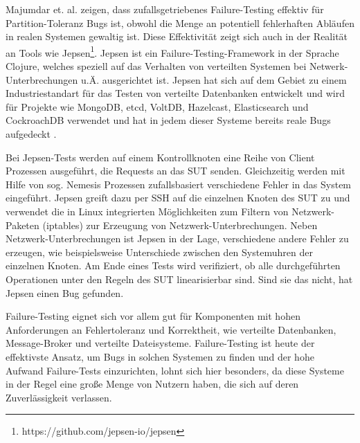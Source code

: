 \documentclass[12pt,a4paper]{report}
\begin{document}
Majumdar et. al. \cite{why_is_random_testing_effective} zeigen, dass zufallsgetriebenes Failure-Testing effektiv für
Partition-Toleranz Bugs ist, obwohl die Menge an potentiell fehlerhaften Abläufen in realen Systemen gewaltig ist. Diese
Effektivität zeigt sich auch in der Realität an Tools wie Jepsen\footnote{https://github.com/jepsen-io/jepsen}. Jepsen ist ein
Failure-Testing-Framework in der Sprache Clojure, welches speziell auf das Verhalten von verteilten Systemen bei
Netwerk-Unterbrechungen u.Ä. ausgerichtet ist. Jepsen hat sich auf dem Gebiet zu einem Industriestandart für das Testen von
verteilte Datenbanken entwickelt \cite{abstracting_the_geniuses} und wird für Projekte wie MongoDB, etcd, VoltDB, Hazelcast,
Elasticsearch und CockroachDB verwendet und hat in jedem dieser Systeme bereits reale Bugs aufgedeckt \cite{jepsen_analyses}.

Bei Jepsen-Tests werden auf einem Kontrollknoten eine Reihe von Client Prozessen ausgeführt, die Requests an das SUT senden.
Gleichzeitig werden mit Hilfe von sog. Nemesis Prozessen zufallsbasiert verschiedene Fehler in das System eingeführt. Jepsen
greift dazu per SSH auf die einzelnen Knoten des SUT zu und verwendet die in Linux integrierten Möglichkeiten zum Filtern von
Netzwerk-Paketen (iptables) zur Erzeugung von Netzwerk-Unterbrechungen. Neben Netzwerk-Unterbrechungen ist Jepsen in der Lage,
verschiedene andere Fehler zu erzeugen, wie beispielsweise Unterschiede zwischen den Systemuhren der einzelnen Knoten. Am Ende
eines Tests wird verifiziert, ob alle durchgeführten Operationen unter den Regeln des SUT linearisierbar sind. Sind sie das nicht,
hat Jepsen einen Bug gefunden. \cite{jepsen_github}

Failure-Testing eignet sich vor allem gut für Komponenten mit hohen Anforderungen an Fehlertoleranz und Korrektheit, wie verteilte
Datenbanken, Message-Broker und verteilte Dateisysteme. Failure-Testing ist heute der effektivste Ansatz, um Bugs in solchen
Systemen zu finden \cite{abstracting_the_geniuses} und der hohe Aufwand Failure-Tests einzurichten, lohnt sich hier besonders, da
diese Systeme in der Regel eine große Menge von Nutzern haben, die sich auf deren Zuverlässigkeit verlassen.
\end{document}
